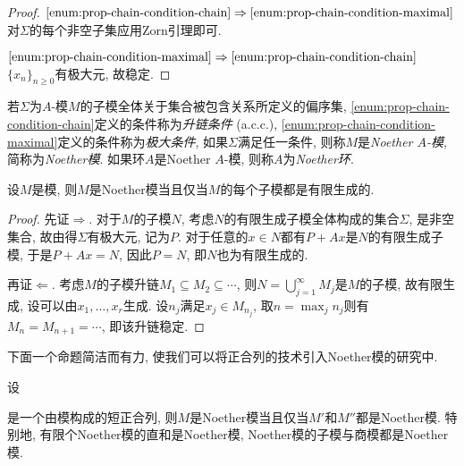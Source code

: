 \begin{proof}
  $\ref{enum:prop-chain-condition-chain}\Rightarrow\ref{enum:prop-chain-condition-maximal}$ 对$\Sigma$的每个非空子集应用Zorn引理即可.

  $\ref{enum:prop-chain-condition-maximal}\Rightarrow\ref{enum:prop-chain-condition-chain}$ $\{x_n\}_{n\geq 0}$有极大元, 故稳定.
\end{proof}

\begin{definition}
  若$\Sigma$为$A$-模$M$的子模全体关于集合被包含关系所定义的偏序集, \ref{enum:prop-chain-condition-chain}定义的条件称为\emph{升链条件} (a.c.c.), \ref{enum:prop-chain-condition-maximal}定义的条件称为\emph{极大条件}, 如果$\Sigma$满足任一条件, 则称$M$是\emph{Noether $A$-模}, 简称为\emph{Noether模}. 如果环$A$是Noether $A$-模, 则称$A$为\emph{Noether环}.
\end{definition}

\begin{proposition}\label{prop:noethermodule}
  设$M$是模, 则$M$是Noether模当且仅当$M$的每个子模都是有限生成的.
\end{proposition}

\begin{proof}
  先证$\Rightarrow$. 对于$M$的子模$N$, 考虑$N$的有限生成子模全体构成的集合$\Sigma$, 是非空集合, 故由得$\Sigma$有极大元, 记为$P$. 对于任意的$x\in N$都有$P+Ax$是$N$的有限生成子模, 于是$P+Ax=N$, 因此$P=N$, 即$N$也为有限生成的.

  再证$\Leftarrow$. 考虑$M$的子模升链$M_1\subseteq M_2\subseteq \dotsb$, 则$N=\bigcup_{j=1}^\infty M_j$是$M$的子模, 故有限生成, 设可以由$x_1, \dotsc, x_r$生成. 设$n_j$满足$x_j\in M_{n_j}$, 取$n=\max_j n_j$则有$M_n=M_{n+1}=\dotsb$, 即该升链稳定.
\end{proof}

下面一个命题简洁而有力, 使我们可以将正合列的技术引入Noether模的研究中.

\begin{proposition}\label{prop:noethermoduleexactsequence}
  设
  是一个由模构成的短正合列, 则$M$是Noether模当且仅当$M'$和$M''$都是Noether模. 特别地, 有限个Noether模的直和是Noether模, Noether模的子模与商模都是Noether模.
\end{proposition}


